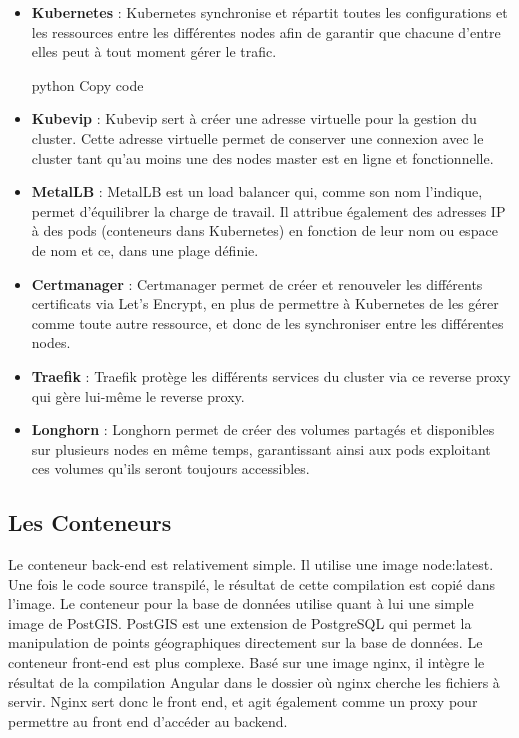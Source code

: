 \begin{itemize}
    \item \textbf{Kubernetes} : Kubernetes synchronise et répartit toutes les configurations et les ressources entre les différentes nodes afin de garantir que chacune d'entre elles peut à tout moment gérer le trafic.

    python
    Copy code
    \item \textbf{Kubevip} : Kubevip sert à créer une adresse virtuelle pour la gestion du cluster. Cette adresse virtuelle permet de conserver une connexion avec le cluster tant qu'au moins une des nodes master est en ligne et fonctionnelle.

    \item \textbf{MetalLB} : MetalLB est un load balancer qui, comme son nom l'indique, permet d'équilibrer la charge de travail. Il attribue également des adresses IP à des pods (conteneurs dans Kubernetes) en fonction de leur nom ou espace de nom et ce, dans une plage définie.

    \item \textbf{Certmanager} : Certmanager permet de créer et renouveler les différents certificats via Let's Encrypt, en plus de permettre à Kubernetes de les gérer comme toute autre ressource, et donc de les synchroniser entre les différentes nodes.

    \item \textbf{Traefik} : Traefik protège les différents services du cluster via ce reverse proxy qui gère lui-même le reverse proxy.

    \item \textbf{Longhorn} : Longhorn permet de créer des volumes partagés et disponibles sur plusieurs nodes en même temps, garantissant ainsi aux pods exploitant ces volumes qu'ils seront toujours accessibles.
\end{itemize}

\subsection{Les Conteneurs}\label{subsec:les-conteneurs}
Le conteneur back-end est relativement simple.
Il utilise une image node:latest.
Une fois le code source transpilé, le résultat de cette compilation est copié dans l'image.
Le conteneur pour la base de données utilise quant à lui une simple image de PostGIS. PostGIS est une extension de PostgreSQL qui permet la manipulation de points géographiques directement sur la base de données.
Le conteneur front-end est plus complexe.
Basé sur une image nginx, il intègre le résultat de la compilation Angular dans le dossier où nginx cherche les fichiers à servir.
Nginx sert donc le front end, et agit également comme un proxy pour permettre au front end d'accéder au backend.

